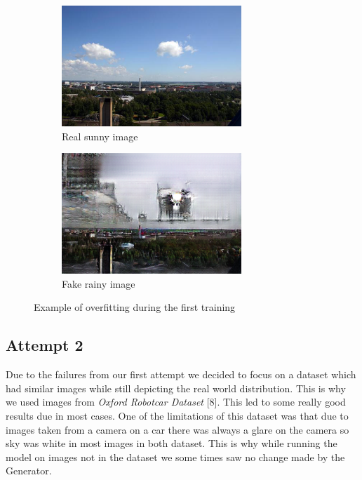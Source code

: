 \documentclass{article}
\begin{document}
\begin{figure}
	\begin{subfigure}{.5\textwidth}
		\centering
		\includegraphics[width=.9\linewidth]{images/v1_real_A.png}
		\caption{Real sunny image}
	\end{subfigure}
	\begin{subfigure}{.5\textwidth}
		\centering
		\includegraphics[width=.9\linewidth]{images/v1_fake_B.png}
		\caption{Fake rainy image}
	\end{subfigure}
	\caption{Example of overfitting during the first training}
	\label{fig:v1_failure}
\end{figure}
\raggedbottom
\subsection{Attempt 2}

Due to the failures from our first attempt we decided to focus on a dataset which had similar images while still depicting the real world distribution. This is why we used images from \textit{Oxford Robotcar Dataset} [8]. This led to some really good results due in most cases. One of the limitations of this dataset was that due to images taken from a camera on a car there was always a glare on the camera so sky was white in most images in both dataset. This is why while running the model on images not in the dataset we some times saw no change made by the Generator.
\end{document}
